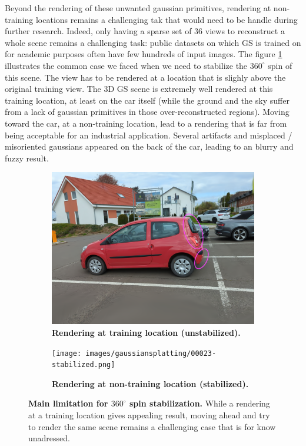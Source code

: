 Beyond the rendering of these unwanted gaussian primitives, rendering at non-training locations remains a challenging tak that would need to be handle during further research. Indeed, only having a sparse set of 36 views to reconstruct a whole scene remains a challenging task: public datasets on which \ac{GS} is trained on for academic purposes often have few hundreds of input images. The figure \ref{fig:nontraining-rendering} illustrates the common case we faced when we need to stabilize the $360^{\circ}$ spin of this scene. The view has to be rendered at a location that is slighly above the original training view. The 3D \ac{GS} scene is extremely well rendered at this training location, at least on the car itself (while the ground and the sky suffer from a lack of gaussian primitives in those over-reconstructed regions). Moving toward the car, at a non-training location, lead to a rendering that is far from being acceptable for an industrial application. Several artifacts and misplaced / misoriented gaussians appeared on the back of the car, leading to an blurry and fuzzy result. 

\begin{figure}[htb!]
  \centering
  \begin{subfigure}[b]{0.45\linewidth}
    \includegraphics[width=\linewidth]{images/gaussiansplatting/00023-unstabilized.png}
    \caption{\textbf{Rendering at training location (unstabilized).}}
  \end{subfigure}
  \quad %
  \begin{subfigure}[b]{0.45\linewidth}
    \texttt{[image: images/gaussiansplatting/00023-stabilized.png]}
    \caption{\textbf{Rendering at non-training location (stabilized).}}
  \end{subfigure}
  \caption{\textbf{Main limitation for $360^{\circ}$ spin stabilization.} While a rendering at a training location gives appealing result, moving ahead and try to render the same scene remains a challenging case that is for know unadressed.}
  \label{fig:nontraining-rendering}
\end{figure}


